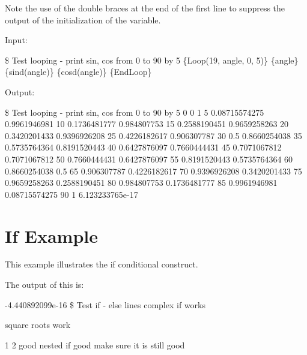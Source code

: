 Note the use of the double braces at the end of the first line to
suppress the output of the initialization of the  variable.

Input:
\begin{apinp}
\$  Test  looping  -  print  sin,  cos  from  0  to  90  by  5
\{Loop(19, angle, 0, 5)\}
\{angle\}  \{sind(angle)\}  \{cosd(angle)\}
\{EndLoop\}
\end{apinp}
Output:
\begin{apout}
\$  Test  looping  -  print  sin,  cos  from  0  to 90  by  5
 0  0    1
 5  0.08715574275 0.9961946981
10  0.1736481777  0.984807753
15  0.2588190451  0.9659258263
20  0.3420201433  0.9396926208
25  0.4226182617  0.906307787
30  0.5    0.8660254038
35  0.5735764364  0.8191520443
40  0.6427876097  0.7660444431
45  0.7071067812  0.7071067812
50  0.7660444431  0.6427876097
55  0.8191520443  0.5735764364
60  0.8660254038  0.5
65  0.906307787  0.4226182617
70  0.9396926208  0.3420201433
75  0.9659258263  0.2588190451
80  0.984807753  0.1736481777
85  0.9961946981  0.08715574275
90  1    6.123233765e-17
\end{apout}

\section{If Example}
This example illustrates the if conditional construct.


The output of this is:
\begin{apout}
-4.440892099e-16
\$ Test if - else lines
 complex if works

       square roots work

1 2
     good nested if
  good
  make sure it is still good
\end{apout}

